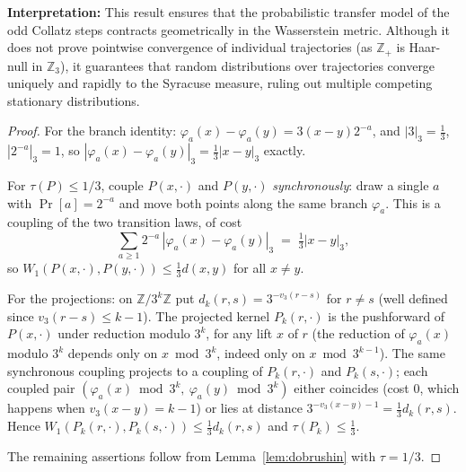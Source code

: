 \documentclass[11pt]{amsart}
\theoremstyle{definition}
\theoremstyle{remark}
\newcommand{\Z}{\mathbb{Z}}
\newcommand{\dW}{W_1}
\begin{document}
\textbf{Interpretation:}
This result ensures that the probabilistic transfer model of the odd Collatz steps contracts geometrically in the Wasserstein metric. Although it does not prove pointwise convergence of individual trajectories (as $\Z_+$ is Haar-null in $\Z_3$), it guarantees that random distributions over trajectories converge uniquely and rapidly to the Syracuse measure, ruling out multiple competing stationary distributions.

\begin{proof}
For the branch identity: $\varphi_a(x) - \varphi_a(y) = 3(x-y)2^{-a}$, and $|3|_3 = \tfrac13$, $|2^{-a}|_3 = 1$, so $|\varphi_a(x)-\varphi_a(y)|_3 = \tfrac13 |x-y|_3$ exactly.

For $\tau(P) \le 1/3$, couple $P(x,\cdot)$ and $P(y,\cdot)$ \emph{synchronously}: draw a single $a$ with $\Pr[a] = 2^{-a}$ and move both points along the same branch $\varphi_a$. This is a coupling of the two transition laws, of cost
\[
\sum_{a\ge1} 2^{-a}\, |\varphi_a(x) - \varphi_a(y)|_3 \;=\; \tfrac13 |x-y|_3 ,
\]
so $\dW(P(x,\cdot), P(y,\cdot)) \le \tfrac13 d(x,y)$ for all $x \ne y$.

For the projections: on $\Z/3^k\Z$ put $d_k(r,s) = 3^{-v_3(r-s)}$ for $r \neq s$ (well defined since $v_3(r-s) \le k-1$). The projected kernel $P_k(r,\cdot)$ is the pushforward of $P(x,\cdot)$ under reduction modulo $3^k$, for any lift $x$ of $r$ (the reduction of $\varphi_a(x)$ modulo $3^k$ depends only on $x \bmod 3^k$, indeed only on $x \bmod 3^{k-1}$). The same synchronous coupling projects to a coupling of $P_k(r,\cdot)$ and $P_k(s,\cdot)$; each coupled pair $(\varphi_a(x) \bmod 3^k,\ \varphi_a(y) \bmod 3^k)$ either coincides (cost $0$, which happens when $v_3(x-y) = k-1$) or lies at distance $3^{-v_3(x-y)-1} = \tfrac13 d_k(r,s)$. Hence $\dW(P_k(r,\cdot), P_k(s,\cdot)) \le \tfrac13 d_k(r,s)$ and $\tau(P_k) \le \tfrac13$.

The remaining assertions follow from Lemma~\ref{lem:dobrushin} with $\tau = 1/3$.
\end{proof}
\end{document}
